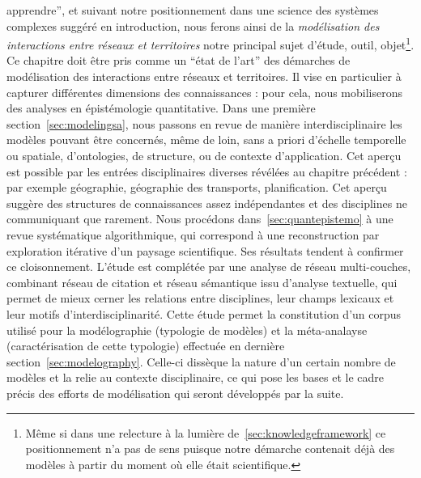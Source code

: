 apprendre'', et suivant notre positionnement dans une science des systèmes complexes suggéré en introduction, nous ferons ainsi de la \emph{modélisation des interactions entre réseaux et territoires} notre principal sujet d'étude, outil, objet\footnote{Même si dans une relecture à la lumière de~\ref{sec:knowledgeframework} ce positionnement n'a pas de sens puisque notre démarche contenait déjà des modèles à partir du moment où elle était scientifique.}. Ce chapitre doit être pris comme un ``état de l'art'' des démarches de modélisation des interactions entre réseaux et territoires. Il vise en particulier à capturer différentes dimensions des connaissances : pour cela, nous mobiliserons des analyses en épistémologie quantitative. Dans une première section~\ref{sec:modelingsa}, nous passons en revue de manière interdisciplinaire les modèles pouvant être concernés, même de loin, sans a priori d'échelle temporelle ou spatiale, d'ontologies, de structure, ou de contexte d'application. Cet aperçu est possible par les entrées disciplinaires diverses révélées au chapitre précédent : par exemple géographie, géographie des transports, planification. Cet aperçu suggère des structures de connaissances assez indépendantes et des disciplines ne communiquant que rarement. Nous procédons dans~\ref{sec:quantepistemo} à une revue systématique algorithmique, qui correspond à une reconstruction par exploration itérative d'un paysage scientifique. Ses résultats tendent à confirmer ce cloisonnement. L'étude est complétée par une analyse de réseau multi-couches, combinant réseau de citation et réseau sémantique issu d'analyse textuelle, qui permet de mieux cerner les relations entre disciplines, leur champs lexicaux et leur motifs d'interdisciplinarité. Cette étude permet la constitution d'un corpus utilisé pour la modélographie (typologie de modèles) et la méta-analayse (caractérisation de cette typologie) effectuée en dernière section~\ref{sec:modelography}. Celle-ci dissèque la nature d'un certain nombre de modèles et la relie au contexte disciplinaire, ce qui pose les bases et le cadre précis des efforts de modélisation qui seront développés par la suite.







